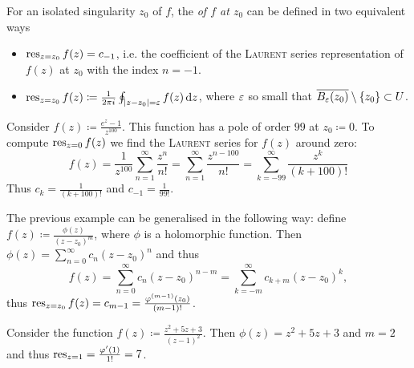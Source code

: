 \documentclass[a4paper,english]{article}
\begin{document}
\begin{defn}[Residue of $f$ at $z_0$]
    For an isolated singularity $z_0$ of $f$, the  \emph{of $f$ at $z_0$} can be defined in two equivalent ways
    \begin{itemize}
        \item 
        $\operatorname*{res}_{z = z_0} f(z) = c_{-1}$, i.e. the coefficient of the \textsc{Laurent} series representation of $f(z)$ at $z_0$ with the index $n = -1$.
        
        \item
        $\operatorname*{res}_{z = z_0} f(z) \coloneqq \frac{1}{2 \pi i} \oint_{| z - z_0 | = \varepsilon} f(z) \mathop{}\!\mathrm{d}{z}$, where $\varepsilon$ so small that $\overline{B_{\varepsilon}(z_0)} \setminus \{ z_0 \} \subset U$.
    \end{itemize}
\end{defn}

\begin{example}[Residues 1] \label{example:Res1}
    Consider $f(z) \coloneqq \frac{e^z - 1}{z^{100}}$.
    This function has a pole of order $99$ at $z_0 \coloneqq 0$.
    To compute $\operatorname*{res}_{z = 0} f(z)$ we find the \textsc{Laurent} series for $f(z)$ around zero:
    \begin{equation*}
        f(z)
        = \frac{1}{z^{100}} \sum_{n = 1}^{\infty} \frac{z^n}{n!}
        = \sum_{n = 1}^{\infty} \frac{z^{n - 100}}{n!}
        = \sum_{k = -99}^{\infty} \frac{z^k}{(k + 100)!}
    \end{equation*}
    Thus $c_k = \frac{1}{(k + 100)!}$ and $c_{-1} = \frac{1}{99!}$.
\end{example} 

\begin{exampleB}[Residues 2] \label{example:Res2}
    The previous example can be generalised in the following way: define $f(z) \coloneqq \frac{\phi(z)}{(z - z_0)^m}$, where $\phi$ is a holomorphic function.
    Then $\phi(z) = \sum_{n = 0}^{\infty} c_n (z - z_0)^n$ and thus
    \begin{equation*}
        f(z)
        = \sum_{n = 0}^{\infty} c_n (z - z_0)^{n - m}
        = \sum_{k = - m}^{\infty} c_{k + m} (z - z_0)^k,
    \end{equation*}
    thus $\operatorname*{res}_{z = z_0} f(z) = c_{m - 1} = \frac{\varphi^{(m - 1)}(z_0)}{(m - 1)!}$.
    
    Consider the function $f(z) \coloneqq \frac{z^2 + 5 z + 3}{(z - 1)^2}$.
    Then $\phi(z) = z^2 + 5 z + 3$ and $m = 2$ and thus $\operatorname*{res}_{z = 1} = \frac{\varphi'(1)}{1!} = 7$.
\end{exampleB}        
\end{document}
